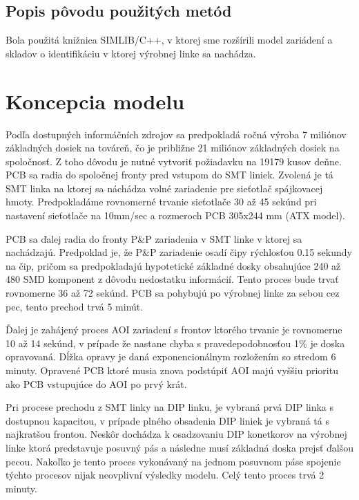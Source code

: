 \documentclass[12pt,a4paper,titlepage,final]{article}
\begin{document}
\subsection{Popis pôvodu použitých metód}
Bola použitá knižnica SIMLIB/C++, v ktorej sme rozšírili model zariádení a 
skladov o identifikáciu v ktorej výrobnej linke sa nachádza.

\section{Koncepcia modelu}
Podľa dostupných informáčních zdrojov sa predpokladá ročná výroba 7 miliónov
základných dosiek na továreň, čo je približne 21 miliónov základných dosiek
na spoločnosť\cite{gigabyte-sprava}. Z toho dôvodu je nutné vytvoriť požiadavku na 19179 kusov deňne.
PCB sa radia do spoločnej fronty pred vstupom do SMT liniek. Zvolená je tá SMT
linka na ktorej sa náchádza volné zariadenie pre sieťotlač spájkovacej hmoty.
Predpokladáme rovnomerné trvanie sieťotlače 30 až 45 sekúnd pri nastavení sieťotlače
na 10mm/sec a rozmeroch PCB 305x244 mm (ATX model)\cite{ATX}.

PCB sa ďalej radia do fronty P\&P zariadenia v SMT linke v ktorej sa nachádzajú.
Predpoklad je, že P\&P zariadenie osadí čipy rýchlosťou 0.15 sekundy na čip, pričom
sa predpokladajú hypotetické základné dosky obsahujúce 240 až 480 SMD komponent
z dôvodu nedostatku informácií. Tento proces bude trvať rovnomerne 36 až 72 sekúnd.
PCB sa pohybujú po výrobnej linke za sebou cez pec, tento prechod trvá 5 minút.

Ďalej je zahájený proces AOI zariadení s frontov ktorého trvanie je rovnomerne 10 až 14 sekúnd, v 
prípade že nastane chyba s pravedepodobnosťou 1\% je doska opravovaná. Dĺžka
opravy je daná exponencionálnym rozložením so stredom 6 minuty. Opravené PCB
ktoré musia znova podstúpiť AOI majú vyššiu prioritu ako PCB vstupujúce do AOI 
po prvý krát.

Pri procese prechodu z SMT linky na DIP linku, je vybraná prvá DIP linka s dostupnou
kapacitou, v prípade plného obsadenia DIP liniek je vybraná tá s najkratšou
frontou. Neskôr dochádza k osadzovaniu DIP konetkorov na výrobnej linke
ktorá predstavuje posuvný pás a následne musí základná doska prejsť ďalšou
pecou. Nakoľko je tento proces vykonávaný na jednom posuvnom páse spojenie týchto
procesov nijak neovplivní výsledky modelu. Celý tento proces trvá 2 minuty.
\end{document}
